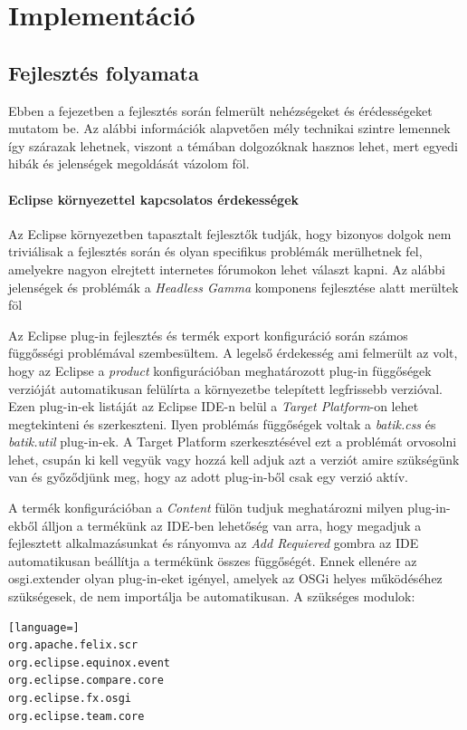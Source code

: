 \section{Implementáció}

\subsection{Fejlesztés folyamata}


Ebben a fejezetben a fejlesztés során felmerült nehézségeket és érédességeket mutatom be. Az alábbi információk alapvetően mély technikai szintre lemennek így szárazak lehetnek, viszont a témában dolgozóknak hasznos lehet, mert egyedi hibák és jelenségek megoldását vázolom föl.

\paragraph{Eclipse környezettel kapcsolatos érdekességek} Az Eclipse környezetben tapasztalt fejlesztők tudják, hogy bizonyos dolgok nem triviálisak a fejlesztés során és olyan specifikus problémák merülhetnek fel, amelyekre nagyon elrejtett internetes fórumokon lehet választ kapni. Az alábbi jelenségek és problémák a \textit{Headless Gamma} komponens fejlesztése alatt merültek föl

Az Eclipse plug-in fejlesztés és termék export konfiguráció során számos függősségi problémával szembesültem. A legelső érdekesség ami felmerült az volt, hogy az Eclipse a \textit{product} konfigurációban meghatározott plug-in függőségek verzióját automatikusan felülírta a környezetbe telepített legfrissebb verzióval. Ezen plug-in-ek listáját az Eclipse IDE-n belül a \textit{Target Platform}-on lehet megtekinteni és szerkeszteni. Ilyen problémás függőségek voltak a \textit{batik.css} és \textit{batik.util} plug-in-ek. A Target Platform szerkesztésével ezt a problémát orvosolni lehet, csupán ki kell vegyük vagy hozzá kell adjuk azt a verziót amire szükségünk van és győződjünk meg, hogy az adott plug-in-ből csak egy verzió aktív.

A termék konfigurációban a \textit{Content} fülön tudjuk meghatározni milyen plug-in-ekből álljon a termékünk az IDE-ben lehetőség van arra, hogy megadjuk a fejlesztett alkalmazásunkat és rányomva az \textit{Add Requiered} gombra az IDE automatikusan beállítja a termékünk összes függőségét. Ennek ellenére az osgi.extender olyan plug-in-eket igényel, amelyek az OSGi helyes működéséhez szükségesek, de nem importálja be automatikusan. A szükséges modulok:
\begin{lstlisting}[language=]
org.apache.felix.scr
org.eclipse.equinox.event
org.eclipse.compare.core
org.eclipse.fx.osgi
org.eclipse.team.core
\end{lstlisting}

